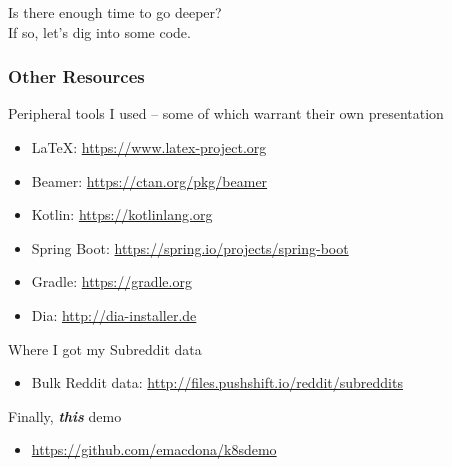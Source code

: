     \begin{frame}
        \begin{center}
            \Huge Is there enough time to go deeper?\\
            If so, let's dig into some code.
        \end{center}
    \end{frame}

    \begin{frame}
        \frametitle{Other Resources}
        Peripheral tools I used -- some of which warrant their own presentation
        \begin{itemize}
            \item \LaTeX: \href{https://www.latex-project.org}{https://www.latex-project.org}
            \item Beamer: \href{https://ctan.org/pkg/beamer}{https://ctan.org/pkg/beamer}
            \item Kotlin: \href{https://kotlinlang.org}{https://kotlinlang.org}
            \item Spring Boot: \href{https://spring.io/projects/spring-boot}{https://spring.io/projects/spring-boot}
            \item Gradle: \href{https://gradle.org}{https://gradle.org}
            \item Dia: \href{http://dia-installer.de}{http://dia-installer.de}
        \end{itemize}
        \smallskip
        Where I got my Subreddit data
        \begin{itemize}
            \item Bulk Reddit data: \href{http://files.pushshift.io/reddit/subreddits}{http://files.pushshift.io/reddit/subreddits}
        \end{itemize}
        Finally, \textbf{\textit{this}} demo
        \begin{itemize}
            \item \href{https://github.com/emacdona/k8sdemo}{https://github.com/emacdona/k8sdemo}
        \end{itemize}
    \end{frame}

